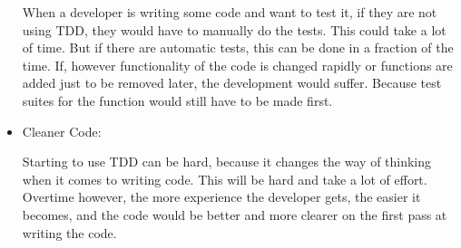 \begin{itemize}
When a developer is writing some code and want to test it, if they are not using TDD, they would have to manually do the tests. This could take a lot of time. But if there are automatic tests, this can be done in a fraction of the time. If, however functionality of the code is changed rapidly or functions are added just to be removed later, the development would suffer. Because test suites for the function would still have to be made first.

\item Cleaner Code:

Starting to use TDD can be hard, because it changes the way of thinking when it comes to writing code. This will be hard and take a lot of effort. Overtime however, the more experience the developer gets, the easier it becomes, and the code would be better and more clearer on the first pass at writing the code.
\end{itemize}